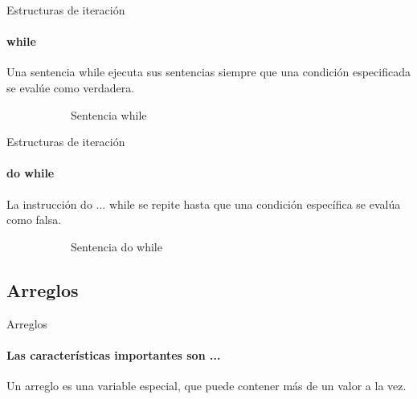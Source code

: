 \documentclass[aspectratio=169]{beamer}
\begin{document}
\begin{darkframes}

    \begin{frame}{Estructuras de iteración}
      \framesubtitle{while}
      Una sentencia while ejecuta sus sentencias siempre que una condición especificada se evalúe como verdadera.

      \begin{figure}[H]
        \begin{subfigure}{.7\textwidth}
          \begin{block}{Sentencia while}
            \while
          \end{block}
        \end{subfigure}
      \end{figure}

    \end{frame}


    \begin{frame}{Estructuras de iteración}
      \framesubtitle{do while}
      La instrucción do ... while se repite hasta que una condición específica se evalúa como falsa.

      \begin{figure}[H]
        \begin{subfigure}{.7\textwidth}
          \begin{block}{Sentencia do while}
            \dowhile
          \end{block}
        \end{subfigure}
      \end{figure}
    \end{frame}

    \subsection{Arreglos}
    \begin{frame}{Arreglos}
      \framesubtitle{Las características importantes son ...}

      \alert{Un arreglo es una variable especial, que puede contener más de un valor a la vez.}\\


\end{frame}
\end{darkframes}
\end{document}
